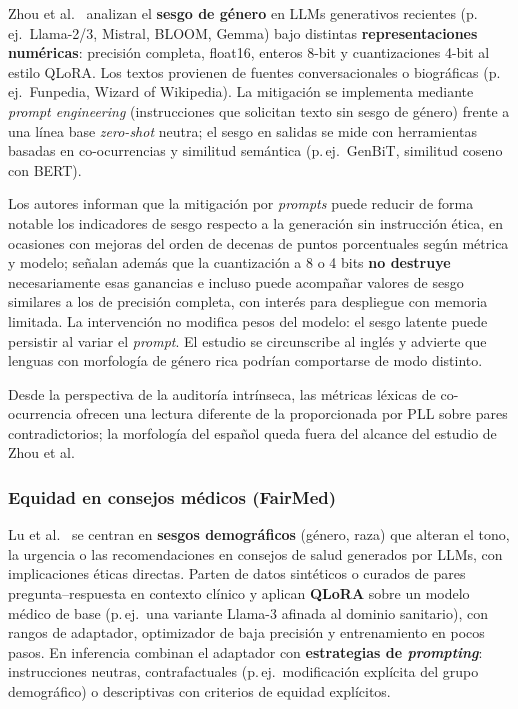 \documentclass[12pt,a4paper]{report}
\begin{document}
Zhou et al.\ \cite{zhou_evaluating_2024} analizan el \textbf{sesgo de género} en LLMs generativos recientes (p.\,ej.\ Llama-2/3, Mistral, BLOOM, Gemma) bajo distintas \textbf{representaciones numéricas}: precisión completa, float16, enteros 8-bit y cuantizaciones 4-bit al estilo QLoRA. Los textos provienen de fuentes conversacionales o biográficas (p.\,ej.\ Funpedia, Wizard of Wikipedia). La mitigación se implementa mediante \textit{prompt engineering} (instrucciones que solicitan texto sin sesgo de género) frente a una línea base \textit{zero-shot} neutra; el sesgo en salidas se mide con herramientas basadas en co-ocurrencias y similitud semántica (p.\,ej.\ GenBiT, similitud coseno con BERT).

Los autores informan que la mitigación por \textit{prompts} puede reducir de forma notable los indicadores de sesgo respecto a la generación sin instrucción ética, en ocasiones con mejoras del orden de decenas de puntos porcentuales según métrica y modelo; señalan además que la cuantización a 8 o 4 bits \textbf{no destruye} necesariamente esas ganancias e incluso puede acompañar valores de sesgo similares a los de precisión completa, con interés para despliegue con memoria limitada. La intervención no modifica pesos del modelo: el sesgo latente puede persistir al variar el \textit{prompt}. El estudio se circunscribe al inglés y advierte que lenguas con morfología de género rica podrían comportarse de modo distinto.

Desde la perspectiva de la auditoría intrínseca, las métricas léxicas de co-ocurrencia ofrecen una lectura diferente de la proporcionada por PLL sobre pares contradictorios; la morfología del español queda fuera del alcance del estudio de Zhou et al.

\subsubsection{Equidad en consejos médicos (FairMed)}

Lu et al.\ \cite{lu_toward_2025} se centran en \textbf{sesgos demográficos} (género, raza) que alteran el tono, la urgencia o las recomendaciones en consejos de salud generados por LLMs, con implicaciones éticas directas. Parten de datos sintéticos o curados de pares pregunta--respuesta en contexto clínico y aplican \textbf{QLoRA} sobre un modelo médico de base (p.\,ej.\ una variante Llama-3 afinada al dominio sanitario), con rangos de adaptador, optimizador de baja precisión y entrenamiento en pocos pasos. En inferencia combinan el adaptador con \textbf{estrategias de \textit{prompting}}: instrucciones neutras, contrafactuales (p.\,ej.\ modificación explícita del grupo demográfico) o descriptivas con criterios de equidad explícitos.
\end{document}

